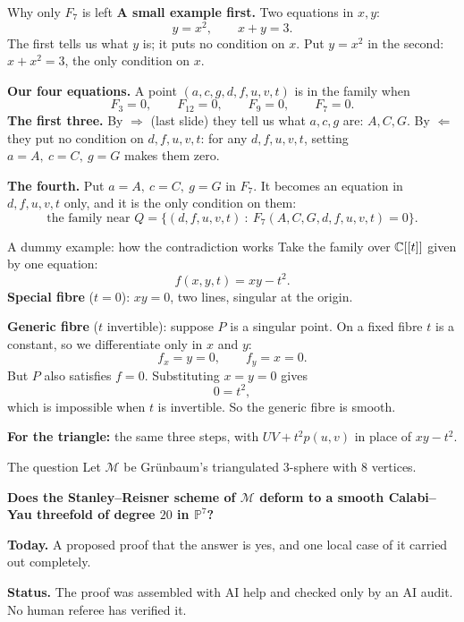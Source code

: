\begin{frame}{Why only \(F_7\) is left}
\textbf{A small example first.} Two equations in \(x,y\):
\[
y=x^2,\qquad x+y=3.
\]
The first tells us what \(y\) is; it puts no condition on \(x\). Put \(y=x^2\) in the second: \(x+x^2=3\), the only condition on \(x\).
\par\medskip
\textbf{Our four equations.} A point \((a,c,g,d,f,u,v,t)\) is in the family when
\[
F_3=0,\qquad F_{12}=0,\qquad F_9=0,\qquad F_7=0.
\]
\textbf{The first three.} By \(\Rightarrow\) (last slide) they tell us what \(a,c,g\) are: \(A,C,G\). By \(\Leftarrow\) they put no condition on \(d,f,u,v,t\): for any \(d,f,u,v,t\), setting \(a=A,\ c=C,\ g=G\) makes them zero.
\par\medskip
\textbf{The fourth.} Put \(a=A,\ c=C,\ g=G\) in \(F_7\). It becomes an equation in \(d,f,u,v,t\) only, and it is the only condition on them:
\[
\boxed{\text{the family near } Q=\{(d,f,u,v,t)\ :\ F_7(A,C,G,d,f,u,v,t)=0\}.}
\]
\end{frame}

\begin{frame}{A dummy example: how the contradiction works}
Take the family over \(\mathbb C[[t]]\) given by one equation:
\[
\boxed{f(x,y,t)=xy-t^2.}
\]
\textbf{Special fibre} (\(t=0\)): \(xy=0\), two lines, singular at the origin.
\par\medskip
\textbf{Generic fibre} (\(t\) invertible): suppose \(P\) is a singular point. On a fixed fibre \(t\) is a constant, so we differentiate only in \(x\) and \(y\):
\[
f_x=y=0,\qquad f_y=x=0.
\]
But \(P\) also satisfies \(f=0\). Substituting \(x=y=0\) gives
\[
\boxed{0=t^2,}
\]
which is impossible when \(t\) is invertible. So the generic fibre is smooth.
\par\medskip
\textbf{For the triangle:} the same three steps, with \(UV+t^2p(u,v)\) in place of \(xy-t^2\).
\end{frame}

\iffalse
\begin{frame}{The question}
Let \(\mathcal M\) be Grünbaum's triangulated \(3\)-sphere with \(8\) vertices.
\par\bigskip
\textbf{Does the Stanley--Reisner scheme of \(\mathcal M\) deform to a smooth Calabi--Yau threefold of degree \(20\) in \(\mathbb P^7\)?}
\par\bigskip
\textbf{Today.} A proposed proof that the answer is yes, and one local case of it carried out completely.
\par\bigskip
\textbf{Status.} The proof was assembled with AI help and checked only by an AI audit. No human referee has verified it.
\end{frame}

